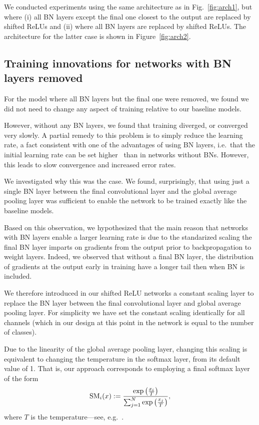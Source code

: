 \documentclass[conference]{IEEEtran}
\begin{document}
We conducted experiments using the same architecture as in Fig.~\ref{fig:arch1}, but where  (i) all BN layers except the final one closest to the output are replaced by shifted ReLUs and (ii) where all BN layers are replaced by shifted ReLUs. The architecture for the latter case is shown in Figure~\ref{fig:arch2}.




\subsection{Training innovations for networks with BN layers removed}

For the model where all BN layers but the final one were removed, we found we did not need to change any aspect of training relative to our baseline models.

However, without any BN layers, we found that training diverged, or converged very slowly. A partial remedy to this problem is to simply reduce the learning rate, a fact consistent with one of the advantages of using BN layers, i.e.~that the initial learning rate can be set higher~\cite{Ioffe.15} than in networks without BNs.  However, this leads to slow convergence and increased error rates.

We investigated why this was the case. We found, surprisingly, that using just a single BN layer between the final convolutional layer and the global average pooling layer  was sufficient to enable the network to be trained exactly like the baseline models. 

Based on this observation, we hypothesized that the main reason that networks with BN layers enable a larger learning rate is due to the standarized scaling the final BN layer imparts on gradients from the output prior to backpropagation to weight layers. Indeed, we observed that without a final BN layer, the distribution of gradients at the output early in training have a longer tail then when BN is included.

We therefore introduced in our shifted ReLU networks a constant scaling layer to replace the BN layer between the final convolutional layer and global average pooling layer. For simplicity we have set the constant scaling identically for all channels (which in our design at this point in the network is equal to the number of classes). 

Due to the linearity of the global average pooling layer, changing this scaling is equivalent to changing the temperature in the softmax layer, from its default value of 1. That is, our approach corresponds to employing a final softmax layer of the form
\begin{equation}
{\rm SM}_i(x) := \frac{\exp{\left(\frac{x_i}{T}\right)}}{\sum_{j=1}^N \exp{\left(\frac{x_j}{T}\right)}},
\end{equation}
where $T$ is the temperature---see, e.g.~\cite{Hinton.15,Guo.17}.
\end{document}
